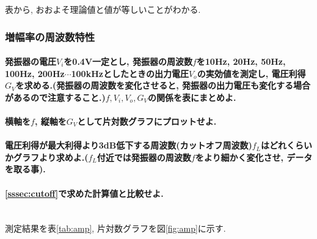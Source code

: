 \documentclass[titlepage]{jsarticle}
\begin{document}
                表から, おおよそ理論値と値が等しいことがわかる.

        \subsubsection{増幅率の周波数特性}
            \paragraph{発振器の電圧$V_i$を0.4V一定とし, 発振器の周波数$f$を10Hz, 20Hz, 50Hz, 100Hz, 200Hz$\cdots$100kHzとしたときの出力電圧$V_o$の実効値を測定し, 電圧利得$G_V$を求める.(発振器の周波数を変化させると, 発振器の出力電圧も変化する場合があるので注意すること.)$f, V_i, V_o, G_V$の関係を表にまとめよ.}
            \paragraph{横軸を$f$, 縦軸を$G_V$として片対数グラフにプロットせよ.}
            \paragraph{電圧利得が最大利得より3dB低下する周波数(カットオフ周波数)$f_L$はどれくらいかグラフより求めよ.($f_L$付近では発振器の周波数$f$をより細かく変化させ, データを取る事).}
            \paragraph{\ref{sssec:cutoff}で求めた計算値と比較せよ.}
            \mbox{} \\
                
                測定結果を表\ref{tab:amp}, 片対数グラフを図\ref{fig:amp}に示す.
\end{document}
